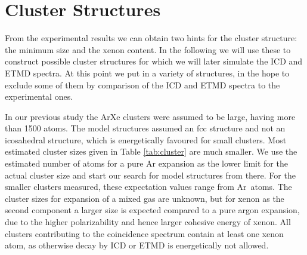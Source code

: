 \section{Cluster Structures}

From the experimental results we can obtain two hints for the cluster
structure: the minimum size and the xenon content. In the following we will 
use these to construct possible cluster structures for which we will later
simulate the ICD and ETMD spectra. At this point we put in a variety of structures,
in the hope to exclude some of them by comparison of
the ICD and ETMD spectra to the experimental ones.

In our previous study\cite{Fasshauer13} the ArXe clusters were assumed
to be large, having more than 1500 atoms. The model structures assumed
an fcc structure and not an icosahedral structure, which is energetically
favoured for small clusters.
Most estimated cluster sizes given in Table \ref{tab:cluster} are much smaller.
We use the estimated number of atoms for a pure Ar expansion as the lower limit for the actual cluster size and start our search for model structures from there.
%
%
For the smaller clusters measured,
these expectation values range from \unit[3--21]{Ar atoms}. 
The cluster sizes for expansion of a mixed gas are unknown, but
for xenon as the second component a larger size is expected compared to a
pure argon expansion, due to the higher polarizability
and hence larger cohesive energy of xenon. All clusters
contributing to the coincidence spectrum
contain at least one xenon atom, as otherwise decay by ICD or ETMD is energetically not allowed.

